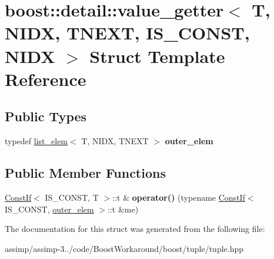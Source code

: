 \hypertarget{structboost_1_1detail_1_1value__getter_3_01_t_00_01_n_i_d_x_00_01_t_n_e_x_t_00_01_i_s___c_o_n_s_t_00_01_n_i_d_x_01_4}{\section{boost\+:\+:detail\+:\+:value\+\_\+getter$<$ T, N\+I\+D\+X, T\+N\+E\+X\+T, I\+S\+\_\+\+C\+O\+N\+S\+T, N\+I\+D\+X $>$ Struct Template Reference}
\label{structboost_1_1detail_1_1value__getter_3_01_t_00_01_n_i_d_x_00_01_t_n_e_x_t_00_01_i_s___c_o_n_s_t_00_01_n_i_d_x_01_4}
}
\subsection*{Public Types}
\begin{DoxyCompactItemize}
\item 
\hypertarget{structboost_1_1detail_1_1value__getter_3_01_t_00_01_n_i_d_x_00_01_t_n_e_x_t_00_01_i_s___c_o_n_s_t_00_01_n_i_d_x_01_4_aeb901dbd5c6a544666819f7e76292d7b}{typedef \hyperlink{structboost_1_1detail_1_1list__elem}{list\+\_\+elem}$<$ T, N\+I\+D\+X, T\+N\+E\+X\+T $>$ {\bfseries outer\+\_\+elem}}\label{structboost_1_1detail_1_1value__getter_3_01_t_00_01_n_i_d_x_00_01_t_n_e_x_t_00_01_i_s___c_o_n_s_t_00_01_n_i_d_x_01_4_aeb901dbd5c6a544666819f7e76292d7b}

\end{DoxyCompactItemize}
\subsection*{Public Member Functions}
\begin{DoxyCompactItemize}
\item 
\hypertarget{structboost_1_1detail_1_1value__getter_3_01_t_00_01_n_i_d_x_00_01_t_n_e_x_t_00_01_i_s___c_o_n_s_t_00_01_n_i_d_x_01_4_a3f0948de30f66baae0c0c3a24820280d}{\hyperlink{structboost_1_1detail_1_1_const_if}{Const\+If}$<$ I\+S\+\_\+\+C\+O\+N\+S\+T, T $>$\+::t \& {\bfseries operator()} (typename \hyperlink{structboost_1_1detail_1_1_const_if}{Const\+If}$<$ I\+S\+\_\+\+C\+O\+N\+S\+T, \hyperlink{structboost_1_1detail_1_1list__elem}{outer\+\_\+elem} $>$\+::t \&me)}\label{structboost_1_1detail_1_1value__getter_3_01_t_00_01_n_i_d_x_00_01_t_n_e_x_t_00_01_i_s___c_o_n_s_t_00_01_n_i_d_x_01_4_a3f0948de30f66baae0c0c3a24820280d}

\end{DoxyCompactItemize}


The documentation for this struct was generated from the following file\+:\begin{DoxyCompactItemize}
\item 
assimp/assimp-\/3../code/\+Boost\+Workaround/boost/tuple/tuple.\+hpp\end{DoxyCompactItemize}
